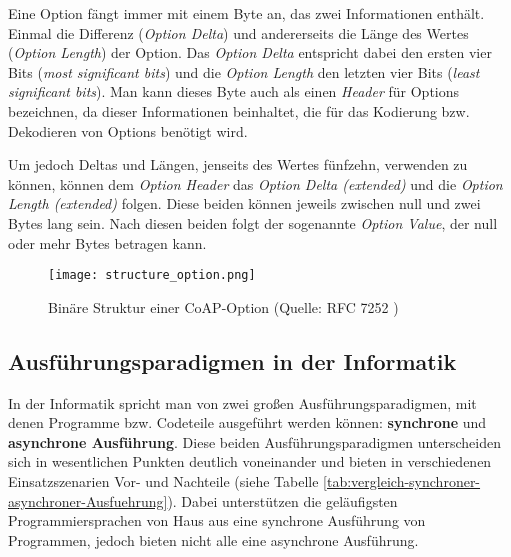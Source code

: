 Eine Option fängt immer mit einem Byte an, das zwei Informationen enthält. Einmal die Differenz (\textit{Option Delta}) und andererseits die Länge des Wertes (\textit{Option Length}) der Option. Das \textit{Option Delta} entspricht dabei den ersten vier Bits (\textit{most significant bits}) und die \textit{Option Length} den letzten vier Bits (\textit{least significant bits}). Man kann dieses Byte auch als einen \textit{Header} für Options bezeichnen, da dieser Informationen beinhaltet, die für das Kodierung bzw. Dekodieren von Options benötigt wird.

Um jedoch Deltas und Längen, jenseits des Wertes fünfzehn, verwenden zu können, können dem \textit{Option Header} das \textit{Option Delta (extended)} und die \textit{Option Length (extended)} folgen. Diese beiden können jeweils zwischen null und zwei Bytes lang sein. Nach diesen beiden folgt der sogenannte \textit{Option Value}, der null oder mehr Bytes betragen kann.

\begin{figure}[h]
    \centering
    \texttt{[image: structure\_option.png]}
    \caption{Binäre Struktur einer CoAP-Option (Quelle: RFC 7252 \autocite{RFC7252})}
    \label{fig:binaere-sturktur-einer-coap-option}
\end{figure}

\subsection{Ausführungsparadigmen in der Informatik}
\label{subsubsec:ausfuehrungsparadigmen-in-der-informatik}

In der Informatik spricht man von zwei großen Ausführungsparadigmen, mit denen Programme bzw. Codeteile ausgeführt werden können: \textbf{synchrone} und \textbf{asynchrone Ausführung}. Diese beiden Ausführungsparadigmen unterscheiden sich in wesentlichen Punkten deutlich voneinander und bieten in verschiedenen Einsatzszenarien Vor- und Nachteile (siehe Tabelle \ref{tab:vergleich-synchroner-asynchroner-Ausfuehrung}). Dabei unterstützen die geläufigsten Programmiersprachen von Haus aus eine synchrone Ausführung von Programmen, jedoch bieten nicht alle eine asynchrone Ausführung.

